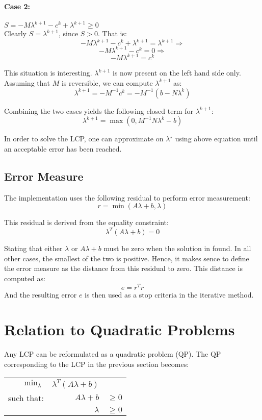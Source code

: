\documentclass[10pt,oneside,a4paper,final,english]{memoir}
\begin{document}
\paragraph{Case 2:} $S = -M\lambda^{k+1}-c^k+\lambda^{k+1} \geq 0$\\
Clearly $S = \lambda^{k+1}$, since $S > 0$. That is:
\[ -M\lambda^{k+1}-c^k+\lambda^{k+1} = \lambda^{k+1} \Rightarrow \]
\[ -M\lambda^{k+1}-c^k = 0 \Rightarrow \]
\[ -M\lambda^{k+1} = c^k \]

This situation is interesting. $\lambda^{k+1}$ is now present on the
left hand side only. Assuming that $M$ is reversible, we can compute
$\lambda^{k+1}$ as:
\[ \lambda^{k+1} = -M^{-1}c^k = -M^{-1}(b - N\lambda^k) \]

Combining the two cases yields the following closed term for
$\lambda^{k+1}$:
\[ \lambda^{k+1} = \max(0, M^{-1}N\lambda^k - b) \]

In order to solve the LCP, one can approximate on $\lambda^\star$
using above equation until an acceptable error has been reached.



\subsection{Error Measure}
The implementation uses the following residual to perform error
measurement:
\[ r = \min(A\lambda + b, \lambda) \]

This residual is derived from the equality constraint:
\[ \lambda^T(A\lambda + b) = 0 \]

Stating that either $\lambda$ or $A\lambda + b$ must be zero when the
solution in found. In all other cases, the smallest of the two is
positive. Hence, it makes sence to define the error measure as the
distance from this residual to zero. This distance is computed as:
\[ e = r^T r \]
And the resulting error $e$ is then used as a stop criteria in the
iterative method.


\section{Relation to Quadratic Problems}
Any LCP can be reformulated as a quadratic problem (QP). The QP
corresponding to the LCP in the previous section becomes:
\begin{center}\begin{tabular}{rrl}
$\min_\lambda$ & $\lambda^T(A\lambda+b)$ & \\
such that: & $A\lambda + b$ & $\geq 0$ \\
           & $\lambda $ & $\geq 0$
\end{tabular}\end{center}
\end{document}
